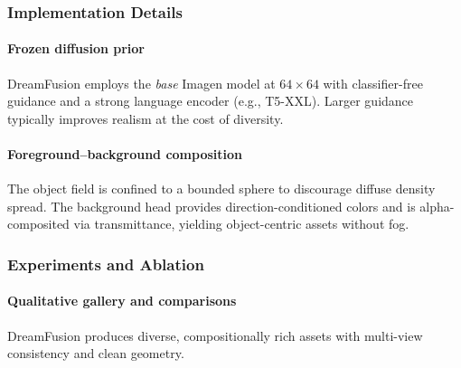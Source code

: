 \begin{enrichment}
\begin{enrichment}
        \subsubsection{Implementation Details}
        \label{subsec:chapter23_dreamfusion_arch}
        \paragraph{Frozen diffusion prior}
        DreamFusion employs the \emph{base} Imagen model at \(64{\times}64\) with classifier-free guidance and a strong language encoder (e.g., T5-XXL). Larger guidance typically improves realism at the cost of diversity.
        
        \paragraph{Foreground–background composition}
        The object field is confined to a bounded sphere to discourage diffuse density spread. The background head provides direction-conditioned colors and is alpha-composited via transmittance, yielding object-centric assets without fog.
        
        \subsubsection{Experiments and Ablation}
        \label{subsec:chapter23_dreamfusion_experiments}
        
        \paragraph{Qualitative gallery and comparisons}
        \label{par:chapter23_dreamfusion_gallery}
        DreamFusion produces diverse, compositionally rich assets with multi-view consistency and clean geometry.
        

\end{enrichment}
\end{enrichment}
